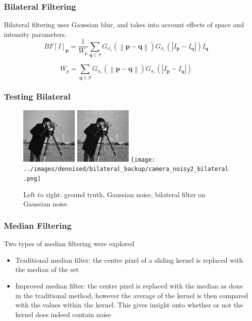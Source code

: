 \documentclass{beamer}
\newcommand{\norm}[1]{\left\| #1 \right\|}
\begin{document}
\begin{frame}
  \frametitle{Bilateral Filtering}
  Bilateral filtering uses Gaussian blur, and takes into account
  effects of space and intensity parameters.
  \[ BF[I]_{\textbf{p}}= \displaystyle \frac{1}{W_p} \sum_{\textbf{q} \in S} G_{\sigma_s} \left(\norm{\textbf{p} - \textbf{q}}\right)
  G_{\sigma_r} \left(|I_{\textbf{p}} -
    I_{\textbf{q}}|\right)I_{\textbf{q}} \]

 \[ W_p = \sum_{\textbf{q} \in S} G_{\sigma_s} \left(\norm{\textbf{p} - \textbf{q}}\right)
   G_{\sigma_r} \left(|I_{\textbf{p}} - I_{\textbf{q}}|\right)\]
 
\end{frame}
%
\begin{frame}
  \frametitle{Testing Bilateral}
  \begin{figure}
    \centering
  \includegraphics[width =
    0.25\textwidth]{../images/camera_truth.png}
    \includegraphics[width =
    0.25\textwidth]{../images/camera_noisy2.png}
    \texttt{[image: ../images/denoised/bilateral\_backup/camera\_noisy2\_bilateral.png]}
    \caption{Left to right: ground truth, Gaussian noise, bilateral
      filter on Gaussian noise }
  \end{figure}
  
\end{frame}

\begin{frame}
  \frametitle{Median Filtering}
  Two types of median filtering were explored
  \begin{itemize}
  \item Traditional median filter: the centre
    pixel of a sliding kernel is replaced with the median of the set
  \item Improved median filter: the centre pixel is replaced with the
    median as done in the traditional method, however the average of the
    kernel is then compared with the values within the kernel. This
    gives insight onto whether or not the kernel does indeed contain
    noise
  \end{itemize}
\end{frame}
\end{document}
